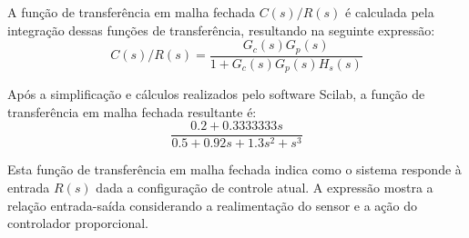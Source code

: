 A função de transferência em malha fechada \(C(s)/R(s)\) é calculada pela integração dessas funções de transferência, resultando na seguinte expressão:
\[
    C(s)/R(s) = \frac{G_c(s) G_p(s)}{1 + G_c(s) G_p(s) H_s(s)}
\]

Após a simplificação e cálculos realizados pelo software Scilab, a função de transferência em malha fechada resultante é:
\[
    \frac{0.2 + 0.3333333s}{0.5 + 0.92s + 1.3s^2 + s^3}
\]

Esta função de transferência em malha fechada indica como o sistema responde à entrada \(R(s)\) dada a configuração de controle atual. A expressão mostra a relação entrada-saída considerando a realimentação do sensor e a ação do controlador proporcional.
